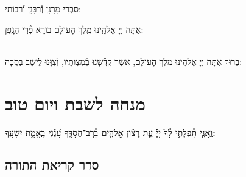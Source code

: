 \documentclass[twoside, openany, parskip=half, 11pt]{book}
\begin{document}
\vspace{-.5\baselineskip}

\begin{scriptsize}
סַבְרֵי מָרָנָן וְ֯רַבָּנָן וְ֯רַבּוֹתַי: \\
\end{scriptsize}
אַתָּה יְיָ אֱלֹהֵֽינוּ מֶֽלֶךְ הָעוֹלָם בּוֹרֵא פְּ֯רִי הַגָֽפֶן:

\begin{sometimes}

\\
בָּרוּךְ אַתָּה יְיָ אֱלֹהֵינוּ מֶלֶךְ הָעוֹלָם, אֲשֶׁר קִדְּ֯שָׁנוּ בְּ֯מִצְוֹתָיו, וְ֯צִוָּנוּ לֵישֵׁב בַּסֻּכָּה:\\
\end{sometimes}

%
\chapter[מנחה לשבת ויום טוב]{ מנחה לשבת ויום טוב }

\ashrei

\uvaletzion

\halfkaddish


\textbf{וַֽאֲנִ֤י תְ֯פִלָּתִ֥י לְ֯ךָ֙ יְיָ֡ עֵ֤ת רָצ֗וֹן אֱלֹהִ֥ים בְּ֯רָב־חַסְדֶּ֑ךָ עֲ֝נֵ֗נִי בֶּֽאֱמֶ֥ת יִשְׁעֶֽךָ:} 


\section*{ סדר קריאת התורה }


\pesicha

\gadlu

\avharachamim

\vesigale


\torahbarachu

\hagomel

\nextpage
\hagbaha

\galila

\yehalelu

\\
\kafdalet

\nextpage
\etzchaim

\end{document}
